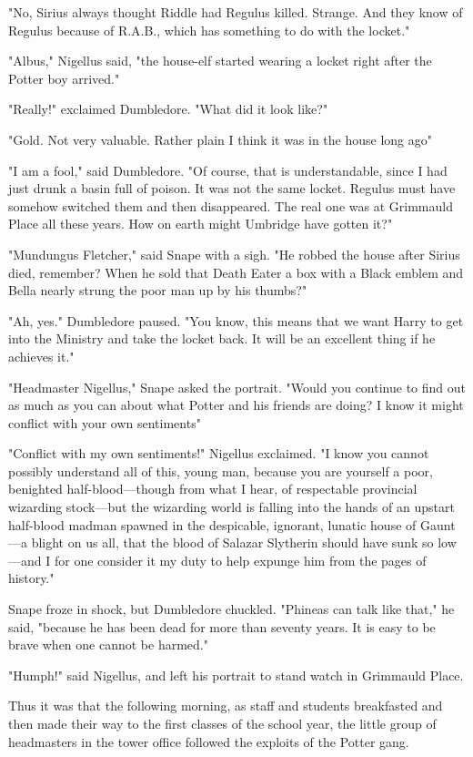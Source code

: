 "No, Sirius always thought Riddle had Regulus killed. Strange. And they know of Regulus because of R.A.B., which has something to do with the locket."

"Albus," Nigellus said, "the house-elf started wearing a locket right after the Potter boy arrived."

"Really!" exclaimed Dumbledore. "What did it look like?"

"Gold. Not very valuable. Rather plain{\el} I think it was in the house long ago{\el}"

"I am a fool," said Dumbledore. "Of course, that is understandable, since I had just drunk a basin full of poison. It was not the same locket. Regulus must have somehow switched them and then disappeared. The real one was at Grimmauld Place all these years. How on earth might Umbridge have gotten it?"

"Mundungus Fletcher," said Snape with a sigh. "He robbed the house after Sirius died, remember? When he sold that Death Eater a box with a Black emblem and Bella nearly strung the poor man up by his thumbs?"

"Ah, yes." Dumbledore paused. "You know, this means that we want Harry to get into the Ministry and take the locket back. It will be an excellent thing if he achieves it."

"Headmaster Nigellus," Snape asked the portrait. "Would you continue to find out as much as you can about what Potter and his friends are doing? I know it might conflict with your own sentiments{\el}"

"Conflict with my own sentiments!" Nigellus exclaimed. "I know you cannot possibly understand all of this, young man, because you are yourself a poor, benighted half-blood—though from what I hear, of respectable provincial wizarding stock—but the wizarding world is falling into the hands of an upstart half-blood madman spawned in the despicable, ignorant, lunatic house of Gaunt—a blight on us all, that the blood of Salazar Slytherin should have sunk so low—and I for one consider it my duty to help expunge him from the pages of history."

Snape froze in shock, but Dumbledore chuckled. "Phineas can talk like that," he said, "because he has been dead for more than seventy years. It is easy to be brave when one cannot be harmed."

"Humph!" said Nigellus, and left his portrait to stand watch in Grimmauld Place.

Thus it was that the following morning, as staff and students breakfasted and then made their way to the first classes of the school year, the little group of headmasters in the tower office followed the exploits of the Potter gang.

